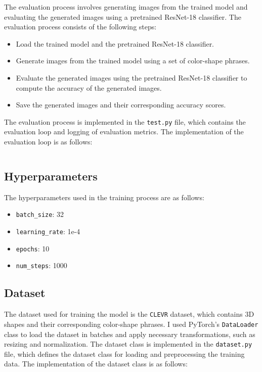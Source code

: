 The evaluation process involves generating images from the trained model and evaluating the generated images using a pretrained ResNet-18 classifier. The evaluation process consists of the following steps:
\begin{itemize}
    \item Load the trained model and the pretrained ResNet-18 classifier.
    \item Generate images from the trained model using a set of color-shape phrases.
    \item Evaluate the generated images using the pretrained ResNet-18 classifier to compute the accuracy of the generated images.
    \item Save the generated images and their corresponding accuracy scores.
\end{itemize}

The evaluation process is implemented in the \texttt{test.py} file, which contains the evaluation loop and logging of evaluation metrics. The implementation of the evaluation loop is as follows:
\inputminted[firstline=15,lastline=110,highlightlines={37,38,41,69-110}]{python}{../src/test.py}

\subsection{Hyperparameters}
\label{sec:hyperparameters}
The hyperparameters used in the training process are as follows:
\begin{itemize}
    \item \texttt{batch\_size}: 32
    \item \texttt{learning\_rate}: 1e-4
    \item \texttt{epochs}: 10
    \item \texttt{num\_steps}: 1000
\end{itemize}

\subsection{Dataset}
\label{sec:dataset}

The dataset used for training the model is the \texttt{CLEVR} dataset, which contains 3D shapes and their corresponding color-shape phrases.
I used PyTorch's \texttt{DataLoader} class to load the dataset in batches and apply necessary transformations, such as resizing and normalization.
The dataset class is implemented in the \texttt{dataset.py} file, which defines the dataset class for loading and preprocessing the training data. The implementation of the dataset class is as follows:
\inputminted[firstline=9, lastline=65]{python}{../src/dataset.py}
